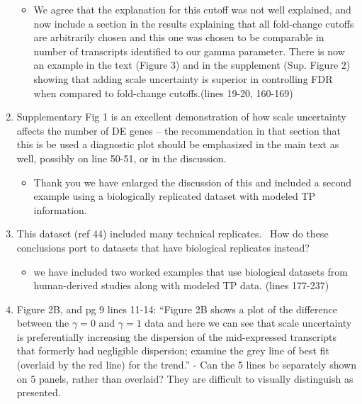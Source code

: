 \documentclass[
]{article}
\providecommand{\tightlist}{%
  \setlength{\itemsep}{0pt}\setlength{\parskip}{0pt}}
\begin{document}
\begin{enumerate}
  \begin{itemize}
  \tightlist
  \item
    We agree that the explanation for this cutoff was not well
    explained, and now include a section in the results explaining that
    all fold-change cutoffs are arbitrarily chosen and this one was
    chosen to be comparable in number of transcripts identified to our
    gamma parameter. There is now an example in the text (Figure 3) and
    in the supplement (Sup. Figure 2) showing that adding scale
    uncertainty is superior in controlling FDR when compared to
    fold-change cutoffs.(lines 19-20, 160-169)
  \end{itemize}
\item
  Supplementary Fig 1 is an excellent demonstration of how scale
  uncertainty affects the number of DE genes -- the recommendation in
  that section that this is be used a diagnostic plot should be
  emphasized in the main text as well, possibly on line 50-51, or in the
  discussion.

  \begin{itemize}
  \tightlist
  \item
    Thank you we have enlarged the discussion of this and included a
    second example using a biologically replicated dataset with modeled
    TP information.
  \end{itemize}
\item
  This dataset (ref 44) included many technical replicates. ~How do
  these conclusions port to datasets that have biological replicates
  instead?

  \begin{itemize}
  \tightlist
  \item
    we have included two worked examples that use biological datasets
    from human-derived studies along with modeled TP data. (lines
    177-237)
  \end{itemize}
\item
  Figure 2B, and pg 9 lines 11-14: ``Figure 2B shows a plot of the
  difference between the \(\gamma = 0\) and \(\gamma = 1\) data and here
  we can see that scale uncertainty is preferentially increasing the
  dispersion of the mid-expressed transcripts that formerly had
  negligible dispersion; examine the grey line of best fit (overlaid by
  the red line) for the trend.'' - Can the 5 lines be separately shown
  on 5 panels, rather than overlaid? They are difficult to visually
  distinguish as presented.


\end{enumerate}
\end{document}
